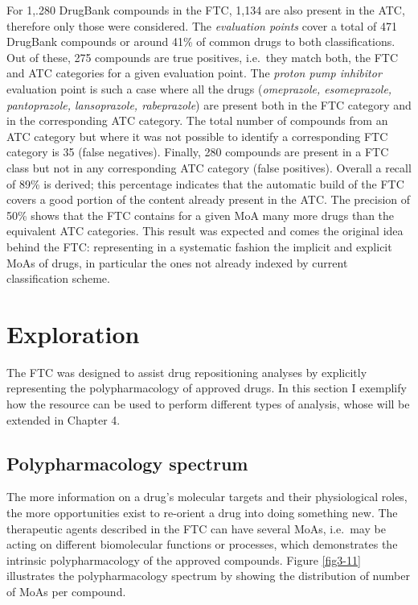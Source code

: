For 1,.280 DrugBank compounds in the FTC, 1,134 are also present in the ATC, therefore only those were considered. The \emph{evaluation points} cover a total of 471 DrugBank compounds or around 41\% of common drugs to both classifications. Out of these, 275 compounds are true positives, i.e.\ they match both, the FTC and ATC categories for a given evaluation point. The \emph{proton pump inhibitor} evaluation point is such a case where all the drugs (\emph{omeprazole, esomeprazole, pantoprazole, lansoprazole, rabeprazole}) are present both in the FTC category and in the corresponding ATC category. The total number of compounds from an ATC category but where it was not possible to identify a corresponding FTC category is 35 (false negatives). Finally, 280 compounds are present in a FTC class but not in any corresponding ATC category (false positives). Overall a recall of 89\% is derived; this percentage indicates that the automatic build of the FTC covers a good portion of the content already present in the ATC. The precision of 50\% shows that the FTC contains for a given MoA many more drugs than the equivalent ATC categories. This result was expected and comes the original idea behind the FTC: representing in a systematic fashion the implicit and explicit MoAs of drugs, in particular the ones not already indexed by current classification scheme.

\section{Exploration}
The FTC was designed to assist drug repositioning analyses by explicitly representing the polypharmacology of approved drugs. In this section I exemplify how the resource can be used to perform different types of analysis, whose will be extended in Chapter 4.

\subsection{Polypharmacology spectrum}
The more information on a drug's molecular targets and their physiological roles, the more opportunities exist to re-orient a drug into doing something new. The therapeutic agents described in the FTC can have several MoAs, i.e.\ may be acting on different biomolecular functions or processes, which demonstrates the intrinsic polypharmacology of the approved compounds. 
Figure \ref{fig3-11} illustrates the polypharmacology spectrum by showing the distribution of number of MoAs per compound.

